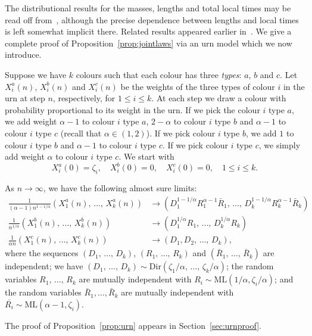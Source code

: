 \documentclass[10pt]{amsart}
\theoremstyle{definition}\newtheorem{defi}[theo]{Definition}\newtheorem{rema}[theo]{Remark}\newtheorem{exam}[theo]{Example}\newtheorem{exem}[theo]{Example}\newtheorem{nota}[theo]{Notation}
\newcommand{\ML}{\mathrm{ML}}
\newcommand{\Dir}{\mathrm{Dir}}
\begin{document}
The distributional results for the masses, lengths and total local times may be read off from~\cite{GHlinebreaking}, although the precise dependence between lengths and local times is left somewhat implicit there. Related results appeared earlier in~\cite{HaasPitmanWinkel}. We give a complete proof of Proposition~\ref{prop:jointlaws} via an urn model which we now introduce.


Suppose we have $k$ colours such that each colour has three \emph{types}: $a$, $b$ and $c$. Let $X_i^a(n)$, $X_i^b(n)$ and $X_i^c(n)$ be the weights of the three types of colour $i$ in the urn at step $n$, respectively, for $1 \le i \le k$. At each step we draw a colour with probability proportional to its weight in the urn. If we pick the colour $i$ type $a$, we add weight $\alpha-1$ to colour $i$ type $a$, $2-\alpha$ to colour $i$ type $b$ and $\alpha-1$ to colour $i$ type $c$ (recall that $\alpha \in (1,2)$). If we pick colour $i$ type $b$, we add $1$ to colour $i$ type $b$ and $\alpha-1$ to colour $i$ type $c$. If we pick colour $i$ type $c$, we simply add weight $\alpha$ to colour $i$ type $c$. We start with
\[
X^a_i(0) = \zeta_i, \quad X^b_i(0) = 0, \quad X^c_i(0) = 0, \quad 1 \le i \le k.
\]


\begin{prop}\label{prop:urn}
As $n \to \infty$, we have the following almost sure limits:
\begin{align*}
\frac{1}{(\alpha-1) n^{1-1/\alpha}}\left(X^a_1(n),\, \ldots,\,X^a_k(n)\right) & \to \left(D_1^{1-1/\alpha} R_1^{\alpha-1} \bar{R}_1,\,\ldots,\,D_k^{1-1/\alpha} R_k^{\alpha-1} \bar{R}_k\right)\\
\frac{1}{n^{1/\alpha}} \left(X^b_1(n),\,\ldots,\, X^b_k(n)\right) & \to \left(D_1^{1/\alpha} R_1, \,\ldots,\,D_k^{1/\alpha} R_k\right) \\
\frac{1}{\alpha n} \left(X^c_1(n),\,\ldots,\,X^c_k(n)\right) & \to \left(D_1, D_2,\,\ldots,\,D_k\right),
\end{align*}
where the sequences $(D_1,\,\ldots,\,D_k)$, $(R_1,\, \ldots,\,R_k)$ and $(\bar{R}_1,\,\ldots,\,\bar{R}_k)$ are independent; we have $(D_1,\,\ldots,\,D_k) \sim \Dir(\zeta_1/\alpha,\,\ldots,\,\zeta_k/\alpha)$; the random variables $R_1,\,\ldots,\,R_k$ are mutually independent with $R_i \sim \ML(1/\alpha, \zeta_i/\alpha)$; and the random variables $\bar{R}_1, \ldots,\bar{R}_k$ are mutually independent with $\bar{R_i} \sim\ML(\alpha-1,\zeta_i)$.
\end{prop}

The proof of Proposition~\ref{prop:urn} appears in Section~\ref{sec:urnproof}.
\end{document}
